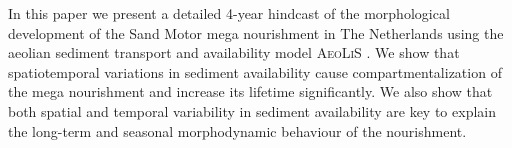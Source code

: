 In this paper we present a detailed 4-year hindcast of the
morphological development of the Sand Motor mega nourishment in The
Netherlands using the aeolian sediment transport and availability
model \textsc{AeoLiS} \citep{Hoonhout2016}. We show that
spatiotemporal variations in sediment availability cause
compartmentalization of the mega nourishment and increase its lifetime
significantly. We also show that both spatial and temporal variability
in sediment availability are key to explain the long-term and seasonal
morphodynamic behaviour of the nourishment.

%
%
